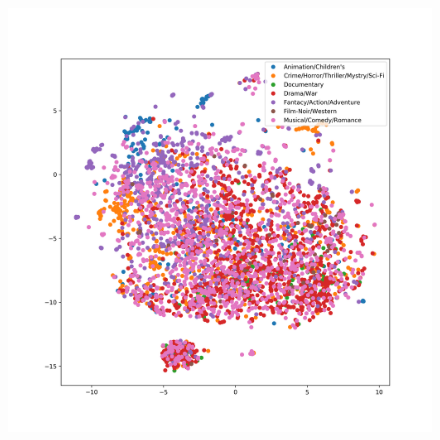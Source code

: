\documentclass[fleqn,a4paper,12pt]{article}
\begin{document}
\begin{figure}[H]
\centering
\includegraphics[width=\linewidth]{tsne.png}
\label{fig:p1.1}
\end{figure}
\end{document}
